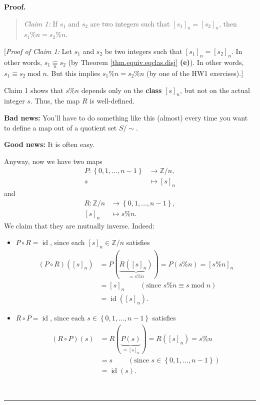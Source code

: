 \documentclass[numbers=enddot,12pt,final,onecolumn,notitlepage]{scrartcl}%
\newcounter{exer}
\numberwithin{exer}{subsection}
\theoremstyle{definition}
\newenvironment{statement}{\begin{quote}}{\end{quote}}
\newenvironment{proof}[1][Proof]{\noindent\textbf{#1.} }{\ \rule{0.5em}{0.5em}}
\begin{document}
\begin{proof}
\begin{statement}
\textit{Claim 1:} If $s_{1}$ and $s_{2}$ are two integers such that $\left[
s_{1}\right]  _{n}=\left[  s_{2}\right]  _{n}$, then $s_{1}\%n=s_{2}\%n$.
\end{statement}

[\textit{Proof of Claim 1:} Let $s_{1}$ and $s_{2}$ be two integers such that
$\left[  s_{1}\right]  _{n}=\left[  s_{2}\right]  _{n}$. In other words,
$s_{1}\underset{n}{\equiv}s_{2}$ (by Theorem \ref{thm.equiv.eqclas.disj}
\textbf{(e)}). In other words, $s_{1}\equiv s_{2}\operatorname{mod}n$. But
this implies $s_{1}\%n=s_{2}\%n$ (by one of the HW1 exercises).]

Claim 1 shows that $s\%n$ depends only on the \textbf{class} $\left[
s\right]  _{n}$, but not on the actual integer $s$. Thus, the map $R$ is well-defined.

\textbf{Bad news:} You'll have to do something like this (almost) every time
you want to define a map out of a quotient set $S/\sim$.

\textbf{Good news:} It is often easy.

Anyway, now we have two maps%
\begin{align*}
P:\left\{  0,1,\ldots,n-1\right\}   &  \rightarrow\mathbb{Z}/n,\\
s  &  \mapsto\left[  s\right]  _{n}%
\end{align*}
and%
\begin{align*}
R:\mathbb{Z}/n  &  \rightarrow\left\{  0,1,\ldots,n-1\right\}  ,\\
\left[  s\right]  _{n}  &  \mapsto s\%n.
\end{align*}
We claim that they are mutually inverse. Indeed:

\begin{itemize}
\item $P\circ R=\operatorname*{id}$, since each $\left[  s\right]  _{n}%
\in\mathbb{Z}/n$ satisfies%
\begin{align*}
\left(  P\circ R\right)  \left(  \left[  s\right]  _{n}\right)   &  =P\left(
\underbrace{R\left(  \left[  s\right]  _{n}\right)  }_{=s\%n}\right)
=P\left(  s\%n\right)  =\left[  s\%n\right]  _{n}\\
&  =\left[  s\right]  _{n}\ \ \ \ \ \ \ \ \ \ \left(  \text{since }s\%n\equiv
s\operatorname{mod}n\right) \\
&  =\operatorname*{id}\left(  \left[  s\right]  _{n}\right)  .
\end{align*}


\item $R\circ P=\operatorname*{id}$, since each $s\in\left\{  0,1,\ldots
,n-1\right\}  $ satisfies%
\begin{align*}
\left(  R\circ P\right)  \left(  s\right)   &  =R\left(  \underbrace{P\left(
s\right)  }_{=\left[  s\right]  _{n}}\right)  =R\left(  \left[  s\right]
_{n}\right)  =s\%n\\
&  =s\ \ \ \ \ \ \ \ \ \ \left(  \text{since }s\in\left\{  0,1,\ldots
,n-1\right\}  \right) \\
&  =\operatorname*{id}\left(  s\right)  .
\end{align*}


\end{itemize}
\end{proof}
\end{document}
